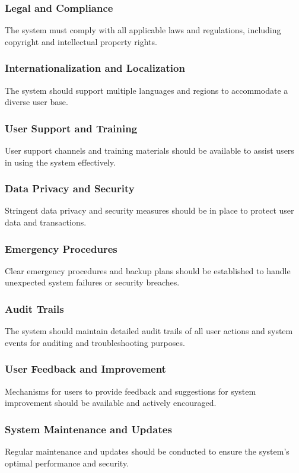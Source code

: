 \documentclass{article}
\begin{document}
\subsubsection{Legal and Compliance}
The system must comply with all applicable laws and regulations, including copyright and intellectual property rights.

\subsubsection{Internationalization and Localization}
The system should support multiple languages and regions to accommodate a diverse user base.

\subsubsection{User Support and Training}
User support channels and training materials should be available to assist users in using the system effectively.

\subsubsection{Data Privacy and Security}
Stringent data privacy and security measures should be in place to protect user data and transactions.

\subsubsection{Emergency Procedures}
Clear emergency procedures and backup plans should be established to handle unexpected system failures or security breaches.

\subsubsection{Audit Trails}
The system should maintain detailed audit trails of all user actions and system events for auditing and troubleshooting purposes.

\subsubsection{User Feedback and Improvement}
Mechanisms for users to provide feedback and suggestions for system improvement should be available and actively encouraged.

\subsubsection{System Maintenance and Updates}
Regular maintenance and updates should be conducted to ensure the system's optimal performance and security.
\end{document}
